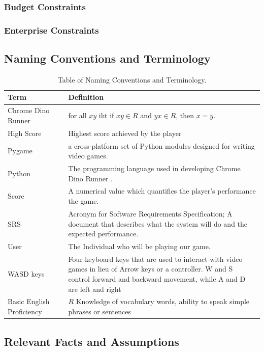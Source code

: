 \documentclass{article}
\begin{document}
\subsubsection{Budget Constraints}
\subsubsection{Enterprise Constraints}
\subsection{Naming Conventions and Terminology}

\begin{table}
\caption{Table of Naming Conventions and Terminology.}
\begin{tabular}{l c p{}}
\toprule
Term       && Definition \\
\midrule
Chrome Dino Runner  && for all $xy$ iht if $xy \in R$ and $yx \in R$, then $x=y$. \\
\midrule
High Score          && Highest score achieved by the player \\
\midrule
Pygame              && a cross-platform set of Python modules designed for writing video games. \\
\midrule
Python              && The programming language used in developing Chrome Dino Runner . \\
\midrule
Score               && A numerical value which quantifies the player's performance the game. \\
\midrule
SRS       && Acronym for Software Requirements Specification; A document that describes what the system will do and the expected performance. \\
\midrule
User       && The Individual who will be playing  our game. \\
\midrule
WASD keys           && Four keyboard keys that are used to interact with video games in lieu of Arrow keys or a controller. W and S control forward and backward movement, while A and D are left and right \\
\midrule
Basic English Proficiency && $R$ Knowledge of vocabulary words, ability to speak simple phrases or sentences \\
\bottomrule
\end{tabular}
\end{table}

\subsection{Relevant Facts and Assumptions}
\end{document}
